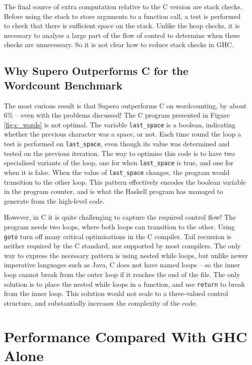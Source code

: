 \documentclass{llncs}
\begin{document}
The final source of extra computation relative to the C version are stack checks. Before using the stack to store arguments to a function call, a test is performed to check that there is sufficient space on the stack. Unlike the heap checks, it is necessary to analyse a large part of the flow of control to determine when these checks are unnecessary. So it is not clear how to reduce stack checks in GHC.

\subsection{Why Supero Outperforms C for the Wordcount Benchmark}

The most curious result is that Supero outperforms C on wordcounting, by about 6\% -- even with the problems discussed! The C program presented in Figure \ref{fig:c_words} is not optimal. The variable \verb"last_space" is a boolean, indicating whether the previous character was a space, or not. Each time round the loop a test is performed on \verb"last_space", even though its value was determined and tested on the previous iteration. The way to optimise this code is to have two specialised variants of the loop, one for when \verb"last_space" is true, and one for when it is false. When the value of \verb"last_space" changes, the program would transition to the other loop. This pattern effectively encodes the boolean variable in the program counter, and is what the Haskell program has managed to generate from the high-level code.

However, in C it is quite challenging to capture the required control flow! The program needs two loops, where both loops can transition to the other. Using \texttt{goto} turn off many critical optimisations in the C compiler. Tail recursion is neither required by the C standard, nor supported by most compilers. The only way to express the necessary pattern is using nested while loops, but unlike newer imperative languages such as Java, C does not have named loops -- so the inner loop cannot break from the outer loop if it reaches the end of the file. The only solution is to place the nested while loops in a function, and use \texttt{return} to break from the inner loop. This solution would not scale to a three-valued control structure, and substantially increases the complexity of the code.

\section{Performance Compared With GHC Alone}
\label{sec:haskell_results}
\end{document}
